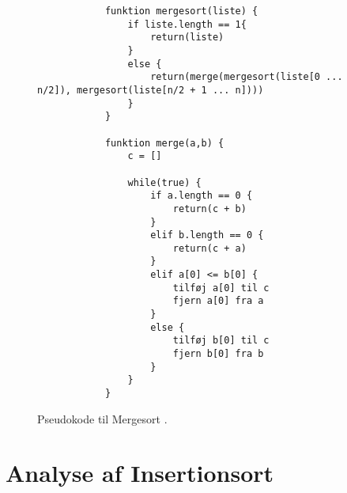 \begin{figure}
	\begin{center}
		\begin{lstlisting}
			funktion mergesort(liste) {
				if liste.length == 1{
					return(liste)
				}
				else {
					return(merge(mergesort(liste[0 ... n/2]), mergesort(liste[n/2 + 1 ... n])))
				}
			}

			funktion merge(a,b) {
				c = []

				while(true) {
					if a.length == 0 {
						return(c + b)
					}
					elif b.length == 0 {
						return(c + a)
					}
					elif a[0] <= b[0] {
						tilføj a[0] til c
						fjern a[0] fra a
					}
					else {
						tilføj b[0] til c
						fjern b[0] fra b
					}
				}
			}

		\end{lstlisting}
	\end{center}
	\vspace{-5mm}
	\caption{Pseudokode til Mergesort \cite[s. 106]{aogd}.}
	\label{fig:Pseudokode til mergesort}
\end{figure}


\section{Analyse af Insertionsort}
\label{sec:Analyse af Insertionsort}


